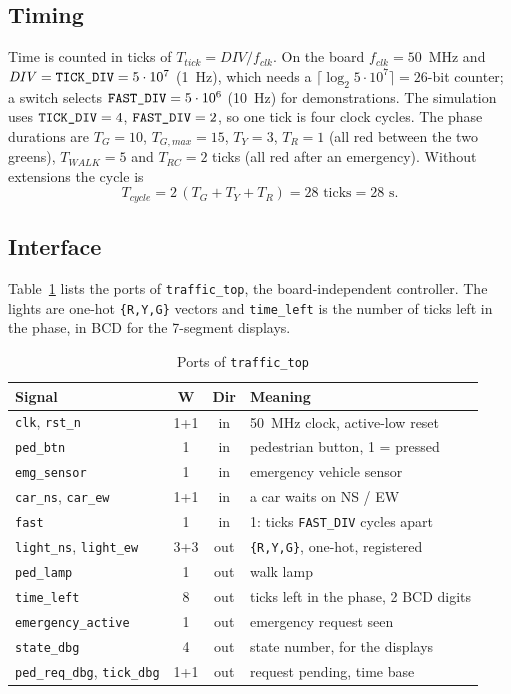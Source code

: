 \documentclass[conference]{IEEEtran}
\newcommand{\code}[1]{\texttt{\upshape #1}}
\begin{document}
\subsection{Timing}
Time is counted in ticks of $T_{tick} = \mathit{DIV}/f_{clk}$. On the board
$f_{clk} = 50$~MHz and $\mathit{DIV} = \code{TICK\_DIV} = 5\cdot 10^{7}$ (1~Hz),
which needs a $\lceil \log_2 5\cdot 10^{7}\rceil = 26$-bit counter; a switch
selects $\code{FAST\_DIV} = 5\cdot 10^{6}$ (10~Hz) for demonstrations. The
simulation uses $\code{TICK\_DIV} = 4$, $\code{FAST\_DIV} = 2$, so one tick is
four clock cycles. The phase durations are $T_G = 10$, $T_{G,max} = 15$,
$T_Y = 3$, $T_R = 1$ (all red between the two greens), $T_{WALK} = 5$ and
$T_{RC} = 2$ ticks (all red after an emergency). Without extensions the cycle is
\begin{equation}
T_{cycle} = 2\,(T_G + T_Y + T_R) = 28 \text{ ticks} = 28\text{ s}.
\end{equation}

\subsection{Interface}
Table~\ref{tab:io} lists the ports of \code{traffic\_top}, the board-independent
controller. The lights are one-hot \code{\{R,Y,G\}} vectors and \code{time\_left}
is the number of ticks left in the phase, in BCD for the 7-segment displays.

\begin{table}[t]
\centering
\caption{Ports of \code{traffic\_top}}
\label{tab:io}
\scriptsize
\setlength{\tabcolsep}{3pt}
\begin{tabular}{@{}l c c p{3.6cm}@{}}
\toprule
Signal & W & Dir & Meaning \\
\midrule
\code{clk}, \code{rst\_n} & 1+1 & in & 50~MHz clock, active-low reset \\
\code{ped\_btn} & 1 & in & pedestrian button, 1 = pressed \\
\code{emg\_sensor} & 1 & in & emergency vehicle sensor \\
\code{car\_ns}, \code{car\_ew} & 1+1 & in & a car waits on NS / EW \\
\code{fast} & 1 & in & 1: ticks \code{FAST\_DIV} cycles apart \\
\code{light\_ns}, \code{light\_ew} & 3+3 & out & \code{\{R,Y,G\}}, one-hot, registered \\
\code{ped\_lamp} & 1 & out & walk lamp \\
\code{time\_left} & 8 & out & ticks left in the phase, 2 BCD digits \\
\code{emergency\_active} & 1 & out & emergency request seen \\
\code{state\_dbg} & 4 & out & state number, for the displays \\
\code{ped\_req\_dbg}, \code{tick\_dbg} & 1+1 & out & request pending, time base \\
\bottomrule
\end{tabular}
\end{table}
\end{document}
